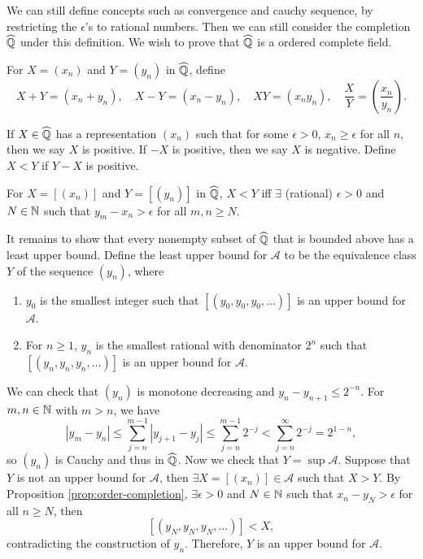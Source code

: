 We can still define concepts such as convergence and cauchy sequence, by restricting the $\epsilon$'s to rational numbers. Then we can still consider the completion $\widehat{{\mathbb Q}}$ under this definition. We wish to prove that $\widehat{{\mathbb Q}}$ is a ordered complete field.

For $X = (x_n)$ and $Y = (y_n)$ in $\widehat{{\mathbb Q}}$, define
\[
X + Y = (x_n + y_n), \quad X - Y = (x_n - y_n), \quad XY = (x_n y_n), \quad \frac X Y = \left(\frac{x_n}{y_n}\right).
\]

If $X\in \widehat{{\mathbb Q}}$ has a representation $(x_n)$ such that for some $\epsilon > 0$, $x_n \geq \epsilon$ for all $n$, then we say $X$ is positive. If $-X$ is positive, then we say $X$ is negative. Define $X < Y$ if $Y - X$ is positive.

\begin{prop}
    \label{prop:order-completion}
    For $X = [(x_n)]$ and $Y = [(y_n)]$ in $\widehat{{\mathbb Q}}$, $X < Y$ iff $\exists$ (rational) $\epsilon > 0$ and $N\in {\mathbb N}$ such that $y_m - x_n > \epsilon$ for all $m, n\geq N$.
\end{prop}

It remains to show that every nonempty subset of $\widehat{{\mathbb Q}}$ that is bounded above has a least upper bound. Define the least upper bound for $\mathcal A$ to be the equivalence class $Y$ of the sequence $(y_n)$, where
\begin{enumerate}
    \item $y_0$ is the smallest integer such that $[(y_0, y_0, y_0, \ldots)]$ is an upper bound for $\mathcal A$.
    \item For $n\geq 1$, $y_n$ is the smallest rational with denominator $2^n$ such that $[(y_n, y_n, y_n, \ldots)]$ is an upper bound for $\mathcal A$.
\end{enumerate}

We can check that $(y_n)$ is monotone decreasing and $y_n - y_{n+1} \leq 2^{-n}$. For $m, n\in {\mathbb N}$ with $m > n$, we have
\[
|y_m - y_n| \leq \sum_{j=n}^{m-1} |y_{j+1} - y_j| \leq \sum_{j=n}^{m-1} 2^{-j} < \sum_{j=n}^\infty 2^{-j} = 2^{1-n},
\]
so $(y_n)$ is Cauchy and thus in $\widehat{{\mathbb Q}}$. Now we check that $Y = \sup \mathcal A$. Suppose that $Y$ is not an upper bound for $\mathcal A$, then $\exists X = [(x_n)] \in \mathcal A$ such that $X > Y$. By Proposition \ref{prop:order-completion}, $\exists\epsilon > 0$ and $N\in {\mathbb N}$ such that $x_n - y_N > \epsilon$ for all $n\geq N$, then
\[
[(y_N, y_N, y_N, \ldots)] < X,
\]
contradicting the construction of $y_n$. Therefore, $Y$ is an upper bound for $\mathcal A$.

